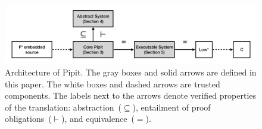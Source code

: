 \begin{figure}
  \includegraphics[width=\textwidth]{figures/core-structure-1920x450.pdf}
\caption{Architecture of Pipit. The gray boxes and solid arrows are defined in this paper. The white boxes and dashed arrows are trusted components. The labels next to the arrows denote verified properties of the translation: abstraction~($\subseteq$), entailment of proof obligations~($\vdash$), and equivalence~($=$).
}
\label{f:core:structure}
\end{figure}
